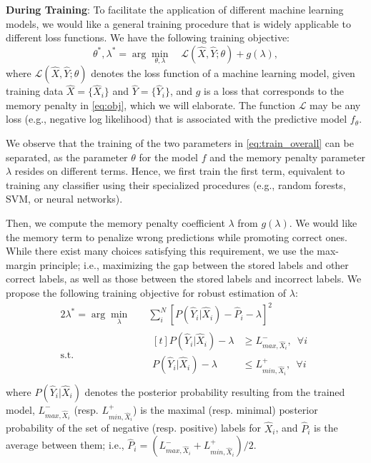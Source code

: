 \documentclass[letterpaper]{article} %
\begin{document}
\textbf{During Training}: To facilitate the application of different machine learning models, we  would like a general training procedure that is widely applicable to different loss functions. We have the following training objective:
\begin{equation}
\label{eq:train_overall}
\theta^*, \lambda^* = \arg\min_{\theta,\lambda}  \quad \mathcal{L}(\hat{X},\hat{Y};\theta) + g(\lambda),
\end{equation}
where $\mathcal{L}(\hat{X},\hat{Y}; \theta)$ denotes the loss function of a machine learning model, given training data $\hat{X}=\{\hat{X}_i\}$ and $\hat{Y}=\{\hat{Y}_i\}$, and $g$ is a loss that corresponds to the memory penalty in \eqref{eq:obj}, which we will elaborate. The function $\mathcal{L}$ may be any loss (e.g., negative log likelihood) that is associated with the predictive model $f_{\theta}$.

We observe that the training of the two parameters in \eqref{eq:train_overall} can be separated, as the parameter $\theta$ for the model $f$ and the memory penalty parameter $\lambda$ resides on different terms. Hence, we first train the first term, equivalent to training any classifier using their specialized procedures (e.g., random forests, SVM, or neural networks).

Then, we compute the memory penalty coefficient $\lambda$ from $g(\lambda)$. We would like the memory term to penalize wrong predictions while promoting correct ones. While there exist many  choices satisfying this requirement, we use the max-margin principle; i.e., maximizing the gap between the stored labels and other correct labels, as well as those between the stored labels and incorrect labels. We propose the following training objective for robust estimation of $\lambda$:
\begin{alignat*}{2}
 \lambda^* = \arg\min_{\lambda}  \quad & \sum_i^N [P(\hat{Y}_i|\hat{X}_i) - \hat{P}_i - \lambda]^2 \\
  \text{s.t.} \quad &  \begin{aligned}[t]
    P(\hat{Y}_i|\hat{X}_i) - \lambda & \ge L^{-}_{max, \hat{X}_i}, \,\,\,\forall i\\
    P(\hat{Y}_i|\hat{X}_i) - \lambda & \le L^{+}_{min, \hat{X}_i}, \,\,\,\forall i\\
  \end{aligned}
\end{alignat*}
where $P(\hat{Y}_i|\hat{X}_i)$ denotes the posterior probability resulting from the trained model, $L^{-}_{max, \hat{X}_i}$ (resp. $L^{+}_{min, \hat{X}_i}$) is the maximal (resp. minimal) posterior probability of the set of negative (resp. positive) labels for  $\hat{X}_i$, and $\hat{P}_i$ is the average between them; i.e., $\hat{P}_i = (L^{-}_{max, \hat{X}_i} + L^{+}_{min, \hat{X}_i})/2$.
\end{document}
